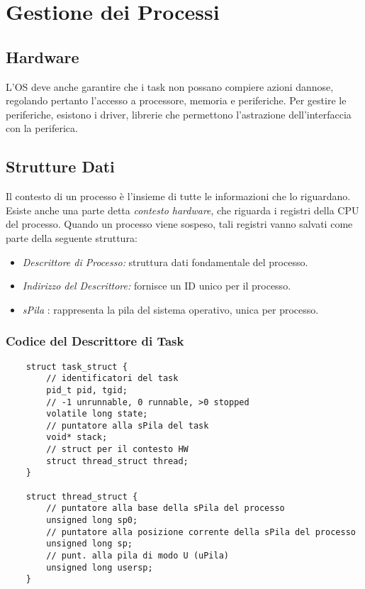 \documentclass[10pt,a4paper]{article}
\begin{document}
    \section{Gestione dei Processi}
    \subsection{Hardware}
    L'OS deve anche garantire che i task non possano compiere azioni dannose, regolando pertanto l'accesso a processore, memoria e periferiche. Per gestire le periferiche, esistono i driver, librerie che permettono l'astrazione dell'interfaccia con la periferica.
    \subsection{Strutture Dati}
    Il contesto di un processo è l'insieme di tutte le informazioni che lo riguardano. Esiste anche una parte detta \emph{contesto hardware}, che riguarda i registri della CPU del processo. Quando un processo viene sospeso, tali registri vanno salvati come parte della seguente struttura:
    \begin{itemize}
        \item \emph{Descrittore di Processo:} struttura dati fondamentale del processo.
        \item \emph{Indirizzo del Descrittore:} fornisce un ID unico per il processo.
        \item \emph{sPila} : rappresenta la pila del sistema operativo, unica per processo.
    \end{itemize}
    \subsubsection{Codice del Descrittore di Task}
    \begin{verbatim}
    struct task_struct {
        // identificatori del task
        pid_t pid, tgid;
        // -1 unrunnable, 0 runnable, >0 stopped
        volatile long state;    
        // puntatore alla sPila del task
        void* stack;
        // struct per il contesto HW
        struct thread_struct thread; 
    }

    struct thread_struct {
        // puntatore alla base della sPila del processo
        unsigned long sp0;
        // puntatore alla posizione corrente della sPila del processo
        unsigned long sp;
        // punt. alla pila di modo U (uPila)
        unsigned long usersp;
    }
    \end{verbatim}
\end{document}
